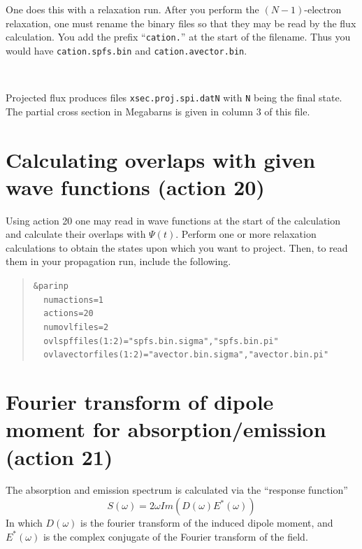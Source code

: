 \documentclass[10pt,leqno, oneside]{book}
\begin{document}
One does this with a relaxation run.
After you perform the $(N-1)$-electron
relaxation, one must rename the binary files so that they may be read by the flux calculation.  You add the prefix ``\verb#cation.#'' at the start
of the filename.  Thus you would have \verb#cation.spfs.bin# and \verb#cation.avector.bin#.   

\

Projected flux produces files \verb#xsec.proj.spi.datN# with \verb#N# being the final state.  The partial cross section in Megabarns is given in column 3 of this file.

\section{Calculating overlaps with given wave functions (action 20)}

Using action 20 one may read in wave functions at the start of the calculation and calculate their overlaps with $\Psi(t)$.
%
Perform one or more relaxation calculations to obtain the states upon which you want to project.  Then, to read them in your
propagation run, include the following.

\begin{quote}
{\footnotesize
\verb#&parinp# \\
\verb#  numactions=1#\\
\verb#  actions=20# \\
\verb#  numovlfiles=2# \\
\verb#  ovlspffiles(1:2)="spfs.bin.sigma","spfs.bin.pi"# \\
\verb#  ovlavectorfiles(1:2)="avector.bin.sigma","avector.bin.pi"# \\
}\end{quote}


\section{Fourier transform of dipole moment for absorption/emission (action 21)}

The absorption and emission spectrum is calculated via the ``response function''
\begin{equation}
S(\omega) = 2 \omega Im (D(\omega) E^*(\omega))
\end{equation}
In which $D(\omega)$ is the fourier transform of the induced dipole moment, and $E^*(\omega)$ is the complex conjugate of
the Fourier transform of the field.
\end{document}
